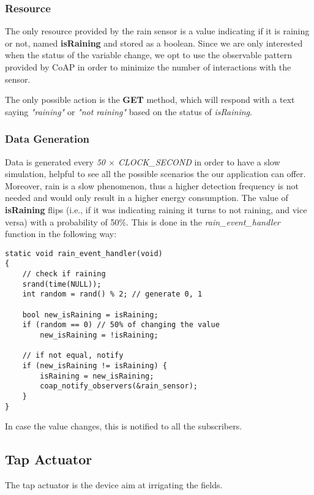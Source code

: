 \subsubsection{Resource}
The only resource provided by the rain sensor is a value indicating if it is raining or not, named \textbf{isRaining} and stored as a boolean. Since we are only interested when the status of the variable change, we opt to use the observable pattern provided by CoAP in order to minimize the number of interactions with the sensor.

The only possible action is the \textbf{GET} method, which will respond with a text saying \textit{"raining"} or \textit{"not raining"} based on the status of \textit{isRaining}.

\subsubsection{Data Generation}
Data is generated every \textit{50 $\times$ CLOCK\_SECOND}  in order to have a slow simulation, helpful to see all the possible scenarios the our application can offer. Moreover, rain is a slow phenomenon, thus a higher detection frequency is not needed and would only result in a higher energy consumption. The value of \textbf{isRaining} flips (i.e., if it was indicating raining it turns to not raining, and vice versa) with a probability of 50\%. This is done in the \textit{rain\_event\_handler} function in the following way:

\begin{lstlisting}
static void rain_event_handler(void)
{
    // check if raining
    srand(time(NULL));
    int random = rand() % 2; // generate 0, 1
    
    bool new_isRaining = isRaining;
    if (random == 0) // 50% of changing the value
        new_isRaining = !isRaining;

    // if not equal, notify
    if (new_isRaining != isRaining) {
        isRaining = new_isRaining;
        coap_notify_observers(&rain_sensor);
    }
}
\end{lstlisting}

In case the value changes, this is notified to all the subscribers.




\subsection{Tap Actuator}
The tap actuator is the device aim at irrigating the fields.

